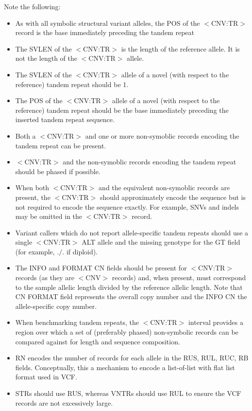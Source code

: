 \documentclass[8pt]{article}
\begin{document}
Note the following:
\begin{itemize}
    \item As with all symbolic structural variant alleles, the POS of the $<$CNV:TR$>$ record is the base immediately preceding the tandem repeat
    \item The SVLEN of the $<$CNV:TR$>$ is the length of the reference allele.
    It is not the length of the $<$CNV:TR$>$ allele.
    \item The SVLEN of the $<$CNV:TR$>$ allele of a novel (with respect to the reference) tandem repeat should be 1.
    \item The POS of the $<$CNV:TR$>$ allele of a novel (with respect to the reference) tandem repeat should be the base immediately preceding the inserted tandem repeat sequence.
    \item Both a $<$CNV:TR$>$ and one or more non-symoblic records encoding the tandem repeat can be present.
    \item $<$CNV:TR$>$ and the non-symoblic records encoding the tandem repeat should be phased if possible.
    \item When both $<$CNV:TR$>$ and the equivalent non-symoblic records are present, the $<$CNV:TR$>$ should approximately encode the sequence but is not required to encode the sequence exactly.
	For example, SNVs and indels may be omitted in the $<$CNV:TR$>$ record.
    \item Variant callers which do not report allele-specific tandem repeats should use a single $<$CNV:TR$>$ ALT allele and the missing genotype for the GT field (for example, $./.$ if diploid).
    \item The INFO and FORMAT CN fields should be present for $<$CNV:TR$>$ records (as they are $<$CNV$>$ records) and, when present, must correspond to the sample allelic length divided by the reference allelic length.
	Note that CN FORMAT field represents the overall copy number and the INFO CN the allele-specific copy number.
    \item When benchmarking tandem repeats, the $<$CNV:TR$>$ interval provides a region over which a set of (preferably phased) non-symbolic records can be compared against for length and sequence composition.
    \item RN encodes the number of records for each allele in the RUS, RUL, RUC, RB fields.
	Conceptually, this a mechanism to encode a list-of-list with flat list format used in VCF.
    \item STRs should use RUS, whereas VNTRs should use RUL to ensure the VCF records are not excessively large.

\end{itemize}
\end{document}
